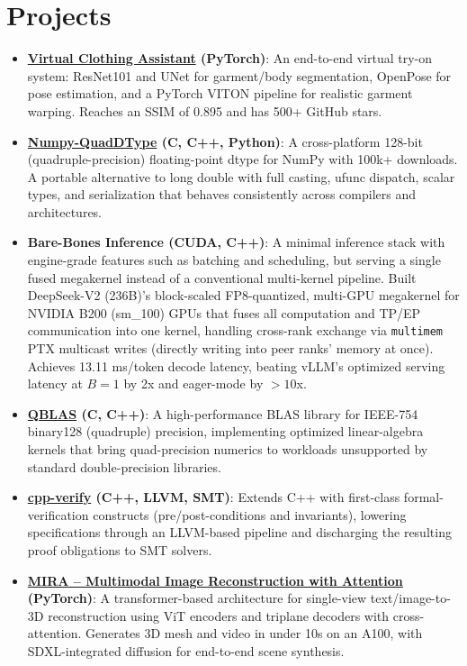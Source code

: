\documentclass[a4paper,11pt]{article}
\newcommand{\resumeItem}[2]{\item\small{\textbf{#1}: #2}\vspace{-1pt}}
\newcommand{\resumeItemListStart}{\begin{itemize}[leftmargin=1.3em, label=$\bullet$, itemsep=1pt, topsep=2pt, parsep=0pt]}
\newcommand{\resumeItemListEnd}{\end{itemize}\vspace{-3pt}}
\begin{document}
\section{Projects}
\resumeItemListStart
  \resumeItem{\href{https://github.com/SwayamInSync/clothes-virtual-try-on}{Virtual Clothing Assistant} (PyTorch)}{An end-to-end virtual try-on system: ResNet101 and UNet for garment/body segmentation, OpenPose for pose estimation, and a PyTorch VITON pipeline for realistic garment warping. Reaches an SSIM of 0.895 and has 500+ GitHub stars.}
  \resumeItem{\href{https://github.com/numpy/numpy-quaddtype}{Numpy-QuadDType} (C, C++, Python)}{A cross-platform 128-bit (quadruple-precision) floating-point dtype for NumPy with 100k+ downloads. A portable alternative to long double with full casting, ufunc dispatch, scalar types, and serialization that behaves consistently across compilers and architectures.}
  \resumeItem{Bare-Bones Inference (CUDA, C++)}{A minimal inference stack with engine-grade features such as batching and scheduling, but serving a single fused megakernel instead of a conventional multi-kernel pipeline. Built DeepSeek-V2 (236B)'s block-scaled FP8-quantized, multi-GPU megakernel for NVIDIA B200 (sm\_100) GPUs that fuses all computation and TP/EP communication into one kernel, handling cross-rank exchange via \texttt{multimem} PTX multicast writes (directly writing into peer ranks' memory at once). Achieves 13.11 ms/token decode latency, beating vLLM's optimized serving latency at $B{=}1$ by 2x and eager-mode by ${>}10$x.}
  \resumeItem{\href{https://github.com/SwayamInSync/QBLAS}{QBLAS} (C, C++)}{A high-performance BLAS library for IEEE-754 binary128 (quadruple) precision, implementing optimized linear-algebra kernels that bring quad-precision numerics to workloads unsupported by standard double-precision libraries.}
  \resumeItem{\href{https://github.com/SwayamInSync/cpp-verify}{cpp-verify} (C++, LLVM, SMT)}{Extends C++ with first-class formal-verification constructs (pre/post-conditions and invariants), lowering specifications through an LLVM-based pipeline and discharging the resulting proof obligations to SMT solvers.}
  \resumeItem{\href{https://github.com/swayamInSync/mira}{MIRA -- Multimodal Image Reconstruction with Attention} (PyTorch)}{A transformer-based architecture for single-view text/image-to-3D reconstruction using ViT encoders and triplane decoders with cross-attention. Generates 3D mesh and video in under 10s on an A100, with SDXL-integrated diffusion for end-to-end scene synthesis.}
\resumeItemListEnd
\end{document}
